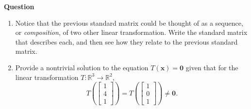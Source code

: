 \documentclass[10pt, titlepage]{article}
\newcounter{question}
\newenvironment{newquestion}
{
	\noindent\textbf{Question \thequestion}
}
{
\stepcounter{question}
\par
}
\renewcommand{\vec}[1]{\bm{#1}}
\begin{document}
\begin{newquestion}
\begin{enumerate}
		\item[\textit{Extra}] Notice that the previous standard matrix could be thought of as a sequence, or \emph{composition}, of two other linear 
					      transformation. Write the standard matrix that describes each, and then see how they relate to the previous standard matrix.
		
		\item Provide a nontrivial solution to the equation \(T(\vec{x}) = \vec{0}\) given that for the linear transformation 
			\(T \colon \mathbb{R}^3 \to \mathbb{R}^2\), \[T\left(\begin{bmatrix}1 \\ 4 \\ 1\end{bmatrix}\right) = T\left(\begin{bmatrix}1 \\ 0 \\ 1\end{bmatrix}\right) \ne \vec{0}.\]
	\end{enumerate}
\end{newquestion}


\end{document}
